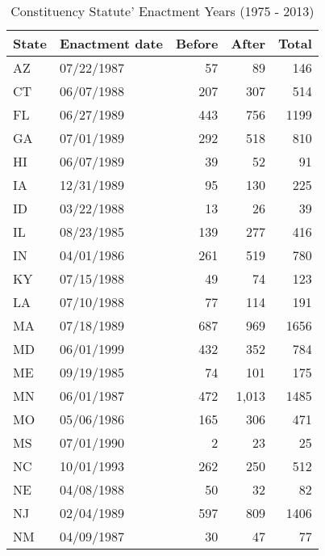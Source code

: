 \begin{table}[H]
	\centering
	\caption{Constituency Statute' Enactment Years (1975 - 2013)}
	\begin{tabular}{lrrrr}
		\toprule
		\toprule
		State & \multicolumn{1}{l}{Enactment date} & \multicolumn{1}{l}{Before} & \multicolumn{1}{l}{After} & \multicolumn{1}{l}{Total} \\
		\midrule
		AZ    & \multicolumn{1}{l}{07/22/1987} & 57    & 89    & 146 \\
		CT    & \multicolumn{1}{l}{06/07/1988} & 207   & 307   & 514 \\
		FL    & \multicolumn{1}{l}{06/27/1989} & 443   & 756   & 1199 \\
		GA    & \multicolumn{1}{l}{07/01/1989} & 292   & 518   & 810 \\
		HI    & \multicolumn{1}{l}{06/07/1989} & 39    & 52    & 91 \\
		IA    & \multicolumn{1}{l}{12/31/1989} & 95    & 130   & 225 \\
		ID    & \multicolumn{1}{l}{03/22/1988} & 13    & 26    & 39 \\
		IL    & \multicolumn{1}{l}{08/23/1985} & 139   & 277   & 416 \\
		IN    & \multicolumn{1}{l}{04/01/1986} & 261   & 519   & 780 \\
		KY    & \multicolumn{1}{l}{07/15/1988} & 49    & 74    & 123 \\
		LA    & \multicolumn{1}{l}{07/10/1988} & 77    & 114   & 191 \\
		MA    & \multicolumn{1}{l}{07/18/1989} & 687   & 969   & 1656 \\
		MD    & \multicolumn{1}{l}{06/01/1999} & 432   & 352   & 784 \\
		ME    & \multicolumn{1}{l}{09/19/1985} & 74    & 101   & 175 \\
		MN    & \multicolumn{1}{l}{06/01/1987} & 472   & 1,013 & 1485 \\
		MO    & \multicolumn{1}{l}{05/06/1986} & 165   & 306   & 471 \\
		MS    & \multicolumn{1}{l}{07/01/1990} & 2     & 23    & 25 \\
		NC    & \multicolumn{1}{l}{10/01/1993} & 262   & 250   & 512 \\
		NE    & \multicolumn{1}{l}{04/08/1988} & 50    & 32    & 82 \\
		NJ    & \multicolumn{1}{l}{02/04/1989} & 597   & 809   & 1406 \\
		NM    & \multicolumn{1}{l}{04/09/1987} & 30    & 47    & 77 \\

\end{tabular}
\end{table}
